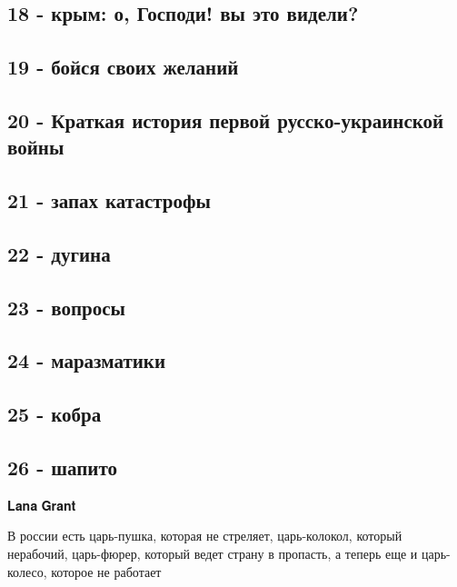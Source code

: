 \subsection{18 - крым: о, Господи! вы это видели?}

\subsection{19 - бойся своих желаний}

\subsection{20 - Краткая история первой русско-украинской войны}

\subsection{21 - запах катастрофы}

\subsection{22 - дугина}

\subsection{23 - вопросы}

\subsection{24 - маразматики}

\subsection{25 - кобра}

\subsection{26 - шапито}

𝐋𝐚𝐧𝐚 𝐆𝐫𝐚𝐧𝐭

В россии есть царь-пушка, которая не стреляет, царь-колокол, который нерабочий,
царь-фюрер, который ведет страну в пропасть, а теперь еще и царь-колесо,
которое не работает

